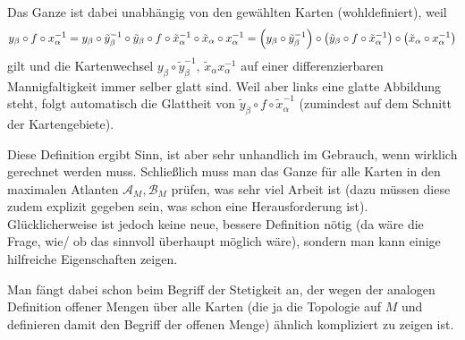 \documentclass[../H_Analysis_main.tex]{subfiles}
\begin{document}
Das Ganze ist dabei unabhängig von den gewählten Karten (wohldefiniert), weil
\begin{equation}
y_\beta \circ f \circ x_\alpha^{-1} = y_\beta \circ \tilde{y}_\beta^{-1} \circ \tilde{y}_\beta \circ f \circ \tilde{x}_\alpha^{-1} \circ \tilde{x}_\alpha \circ x_\alpha^{-1} = \qty(y_\beta \circ \tilde{y}_\beta^{-1}) \circ \qty(\tilde{y}_\beta \circ f \circ \tilde{x}_\alpha^{-1}) \circ \qty(\tilde{x}_\alpha \circ x_\alpha^{-1})
\end{equation}
gilt und die Kartenwechsel $y_\beta \circ \tilde{y}_\beta^{-1}, \, \tilde{x}_\alpha x_\alpha^{-1}$ auf einer differenzierbaren Mannigfaltigkeit immer selber glatt sind. Weil aber links eine glatte Abbildung steht, folgt automatisch die Glattheit von $\tilde{y}_\beta \circ f \circ \tilde{x}_\alpha^{-1}$ (zumindest auf dem Schnitt der Kartengebiete).




Diese Definition ergibt Sinn, ist aber sehr unhandlich im Gebrauch, wenn wirklich gerechnet werden muss. Schließlich muss man das Ganze für alle Karten in den maximalen Atlanten $\mathcal{A}_M, \mathcal{B}_M$ prüfen, was sehr viel Arbeit ist (dazu müssen diese zudem explizit gegeben sein, was schon eine Herausforderung ist). Glücklicherweise ist jedoch keine neue, bessere Definition nötig (da wäre die Frage, wie/ ob das sinnvoll überhaupt möglich wäre), sondern man kann einige hilfreiche Eigenschaften zeigen.

Man fängt dabei schon beim Begriff der Stetigkeit an, der wegen der analogen Definition offener Mengen über alle Karten (die ja die Topologie auf $M$ und definieren damit den Begriff der offenen Menge) ähnlich kompliziert zu zeigen ist.
\end{document}
